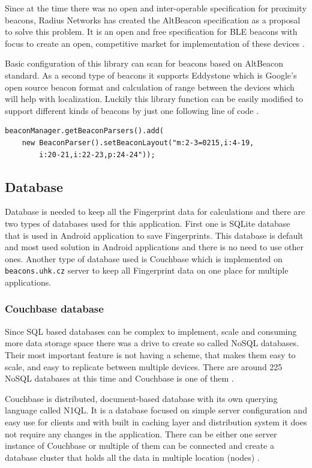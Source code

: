 Since at the time there was no open and inter-operable specification for proximity beacons, Radius Networks has created the AltBeacon specification as a proposal to solve this problem. It is an open and free specification for BLE beacons with focus to create an open, competitive market for implementation of these devices \cite{AltB}.

Basic configuration of this library can scan for beacons based on AltBeacon standard. As a second type of beacons it supports Eddystone which is Google's open source beacon format and calculation of range between the devices which will help with localization. Luckily this library function can be easily modified to support different kinds of beacons by just one following line of code \cite{ABL, EDDF}.

\begin{lstlisting}[caption=Enable all beacons]
beaconManager.getBeaconParsers().add(
	new BeaconParser().setBeaconLayout("m:2-3=0215,i:4-19,
		i:20-21,i:22-23,p:24-24"));
\end{lstlisting}

\subsection{Database}\label{subsec:Database}
Database is needed to keep all the Fingerprint data for calculations and there are two types of databases used for this application. First one is SQLite database that is used in Android application to save Fingerprints. This database is default and most used solution in Android applications and there is no need to use other ones. Another type of database used is Couchbase which is implemented on \verb|beacons.uhk.cz| server to keep all Fingerprint data on one place for multiple applications.

\subsubsection{Couchbase database}\label{subsec:CouchbaseDatabase}
Since SQL based databases can be complex to implement, scale and consuming more data storage space there was a drive to create so called NoSQL databases. Their most important feature is not having a scheme, that makes them easy to scale, and easy to replicate between multiple devices. There are around 225 NoSQL databases at this time and Couchbase is one of them \cite{NOSQLDB}.

Couchbase is distributed, document-based database with its own querying language called N1QL. It is a database focused on simple server configuration and easy use for clients and with built in caching layer and distribution system it does not require any changes in the application. There can be either one server instance of Couchbase or multiple of them can be connected and create a database cluster that holds all the data in multiple location (nodes) \cite{GSWCBS}.

